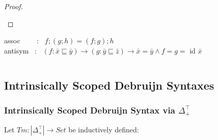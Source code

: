 \documentclass[aspectratio=169]{beamer}
\theoremstyle{remarkstyle}
\begin{document}
\begin{frame}[fragile]
\begin{columns}
\begin{column}{0.6\textwidth}
\begin{proof}
\begin{small}
        \end{small}
      \end{proof}
      \begin{corollary}
        \begin{small}
        assoc \ \ \ \ : \ $f;(g;h) = (f;g);h$\\
        antisym \ : \ $(f : \bar{x} ⊑ \bar{y}) → (g : \bar{y} ⊑ \bar{z}) → \bar{x} = \bar{y} \land f = g = $ id $\bar{x}$
        \end{small}
      \end{corollary}  
    \end{column}
  \end{columns}
\end{frame}


\subsection{Intrinsically Scoped Debruijn Syntaxes}

\begin{frame}[fragile]
  \frametitle{Intrinsically Scoped Debruijn Syntax via $Δ_+^⊤$}
  \begin{definition}
    Let $Tm : |Δ_+^⊤| → Set$ be inductively defined: \\
    \begin{columns}
      \begin{column}{0.3\textwidth}
        \begin{center}
        \end{center}
      \end{column}
      \begin{column}{0.3\textwidth}
        \begin{center}
        \end{center}
      \end{column}
      \begin{column}{0.3\textwidth}
        \begin{center}
        \end{center}
      \end{column}
    \end{columns}
  \end{definition}
  \begin{example}
    
  \end{example}
\end{frame}
\end{document}
